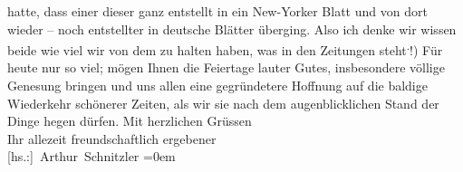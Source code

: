 \begin{ledgroupsized}[t]{13cm}
               hatte, dass einer dieser \label{K_L02224-4v}\label{K_L02224-4h} ganz entstellt in ein New-Yorker Blatt und von dort
               wieder \introOben{}–\introOben{} noch entstellter in deutsche Blätter überging.
               Also ich denke wir wissen beide wie viel wir von dem zu halten haben, was in den
               Zeitungen steht\substVorne{}\textsuperscript{.}\substDazwischen{}!\substHinten{}\introOben{})\introOben{}\pend
           \pstart
           Für heute nur so viel; mögen Ihnen die Feiertage lauter Gutes, insbesondere völlige
               Genesung bringen und uns allen eine gegründetere Hoffnung auf die baldige Wiederkehr
               schönerer Zeiten, als wir sie nach dem augenblicklichen Stand der Dinge hegen
               dürfen.\pend
           \pstart
           Mit herzlichen Grüssen{\\[\baselineskip]}Ihr allezeit freundschaftlich ergebener{\\[\baselineskip]}\spacefill\mbox{{[}hs.:{]} Arthur Schnitzler}\pend
           \leftskip=0em{}
         
         \endnumbering{}\end{ledgroupsized}  \newcommand{\dateiname}{L02224}\newcommand{\titel}{Arthur Schnitzler an Georg Brandes, 22. 12. 1915}\newcommand{\editorInnen}{Martin Anton Müller und Gerd-Hermann Susen}
      